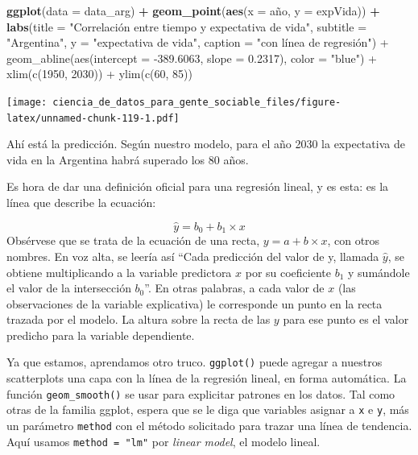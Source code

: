 \documentclass[]{book}
\newenvironment{Shaded}{\begin{snugshade}}{\end{snugshade}}
\newcommand{\KeywordTok}[1]{\textcolor[rgb]{0.13,0.29,0.53}{\textbf{#1}}}
\newcommand{\DataTypeTok}[1]{\textcolor[rgb]{0.13,0.29,0.53}{#1}}
\newcommand{\StringTok}[1]{\textcolor[rgb]{0.31,0.60,0.02}{#1}}
\newcommand{\OperatorTok}[1]{\textcolor[rgb]{0.81,0.36,0.00}{\textbf{#1}}}
\newcommand{\NormalTok}[1]{#1}
\begin{document}
\begin{Shaded}
\begin{Highlighting}[]
\KeywordTok{ggplot}\NormalTok{(}\DataTypeTok{data =}\NormalTok{ data_arg) }\OperatorTok{+}\StringTok{ }
\StringTok{    }\KeywordTok{geom_point}\NormalTok{(}\KeywordTok{aes}\NormalTok{(}\DataTypeTok{x =}\NormalTok{ año, }\DataTypeTok{y =}\NormalTok{ expVida)) }\OperatorTok{+}
\StringTok{    }\KeywordTok{labs}\NormalTok{(}\DataTypeTok{title =} \StringTok{"Correlación entre tiempo y expectativa de vida"}\NormalTok{,}
         \DataTypeTok{subtitle =} \StringTok{"Argentina"}\NormalTok{,}
         \DataTypeTok{y =} \StringTok{"expectativa de vida"}\NormalTok{,}
         \DataTypeTok{caption =} \StringTok{"con línea de regresión") +}
\StringTok{    geom_abline(aes(intercept = -389.6063, slope = 0.2317), color = "}\NormalTok{blue}\StringTok{") +}
\StringTok{    xlim(c(1950, 2030)) +}
\StringTok{    ylim(c(60, 85))}
\end{Highlighting}
\end{Shaded}

\texttt{[image: ciencia\_de\_datos\_para\_gente\_sociable\_files/figure-latex/unnamed-chunk-119-1.pdf]}

Ahí está la predicción. Según nuestro modelo, para el año 2030 la
expectativa de vida en la Argentina habrá superado los 80 años.

Es hora de dar una definición oficial para una regresión lineal, y es
esta: es la línea que describe la ecuación:

\[ \hat{y} = b_0 + b_1 \times x \] Obsérvese que se trata de la ecuación
de una recta, \(y = a + b \times x\), con otros nombres. En voz alta, se
leería así ``Cada predicción del valor de y, llamada \(\hat{y}\), se
obtiene multiplicando a la variable predictora \(x\) por su coeficiente
\(b_1\) y sumándole el valor de la intersección \(b_0\)''. En otras
palabras, a cada valor de \(x\) (las observaciones de la variable
explicativa) le corresponde un punto en la recta trazada por el modelo.
La altura sobre la recta de las \(y\) para ese punto es el valor
predicho para la variable dependiente.

Ya que estamos, aprendamos otro truco. \texttt{ggplot()} puede agregar a
nuestros scatterplots una capa con la línea de la regresión lineal, en
forma automática. La función \texttt{geom\_smooth()} se usar para
explicitar patrones en los datos. Tal como otras de la familia ggplot,
espera que se le diga que variables asignar a \texttt{x} e \texttt{y},
más un parámetro \texttt{method} con el método solicitado para trazar
una línea de tendencia. Aquí usamos \texttt{method\ =\ "lm"} por
\emph{linear model}, el modelo lineal.
\end{document}
